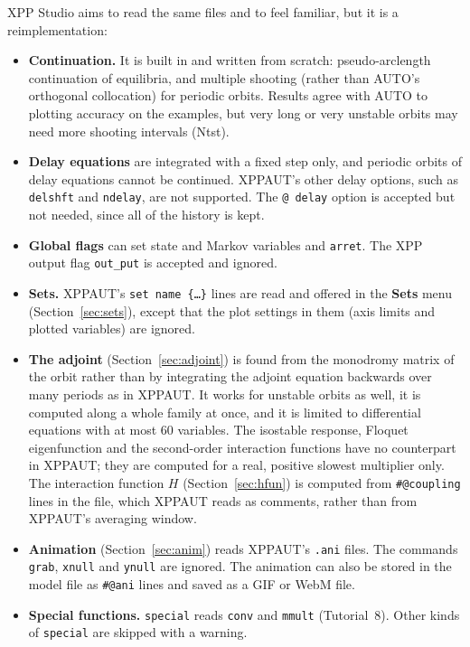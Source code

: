 \documentclass[11pt,a4paper]{article}
\newcommand{\XS}{\textsf{XPP Studio}}
\newcommand{\XPP}{\textsf{XPPAUT}}
\newcommand{\ui}[1]{\textsf{\textbf{#1}}}          %
\begin{document}
\XS{} aims to read the same files and to feel familiar, but it is a reimplementation:
\begin{itemize}
  \item \textbf{Continuation.} It is built in and written from scratch: pseudo-arclength continuation of equilibria, and multiple shooting (rather than \textsf{AUTO}'s orthogonal collocation) for periodic orbits. Results agree with \textsf{AUTO} to plotting accuracy on the examples, but very long or very unstable orbits may need more shooting intervals (Ntst).
  \item \textbf{Delay equations} are integrated with a fixed step only, and periodic orbits of delay equations cannot be continued. \XPP{}'s other delay options, such as \texttt{delshft} and \texttt{ndelay}, are not supported. The \texttt{@ delay} option is accepted but not needed, since all of the history is kept.
  \item \textbf{Global flags} can set state and Markov variables and \texttt{arret}. The XPP output flag \texttt{out\_put} is accepted and ignored.
  \item \textbf{Sets.} \XPP{}'s \texttt{set name \{\ldots\}} lines are read and offered in the \ui{Sets} menu (Section~\ref{sec:sets}), except that the plot settings in them (axis limits and plotted variables) are ignored.
  \item \textbf{The adjoint} (Section~\ref{sec:adjoint}) is found from the monodromy matrix of the orbit rather than by integrating the adjoint equation backwards over many periods as in \XPP{}. It works for unstable orbits as well, it is computed along a whole family at once, and it is limited to differential equations with at most 60 variables. The isostable response, Floquet eigenfunction and the second-order interaction functions have no counterpart in \XPP{}; they are computed for a real, positive slowest multiplier only. The interaction function $H$ (Section~\ref{sec:hfun}) is computed from \texttt{\#@coupling} lines in the file, which \XPP{} reads as comments, rather than from \XPP{}'s averaging window.
  \item \textbf{Animation} (Section~\ref{sec:anim}) reads \XPP{}'s \texttt{.ani} files. The commands \texttt{grab}, \texttt{xnull} and \texttt{ynull} are ignored. The animation can also be stored in the model file as \texttt{\#@ani} lines and saved as a GIF or WebM file.
  \item \textbf{Special functions.} \texttt{special} reads \texttt{conv} and \texttt{mmult} (Tutorial~8). Other kinds of \texttt{special} are skipped with a warning.

\end{itemize}
\end{document}
